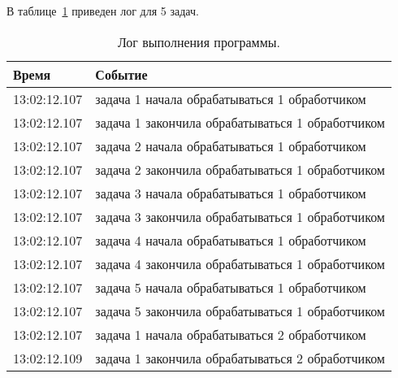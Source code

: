 В таблице~\ref{tbl:log1} приведен лог для 5 задач.

\begin{table}[h]
	\begin{center}
		\begin{threeparttable}
		\captionsetup{justification=raggedright,singlelinecheck=off}
		\caption{Лог выполнения программы.}
		\label{tbl:log1}
                    \begin{tabular}{|l|l|}
                        \hline
                        Время & Событие\\
                        \hline
                         13:02:12.107  & задача 1 начала обрабатываться 1 обработчиком \\
                        \hline
                         13:02:12.107  & задача 1 закончила обрабатываться 1 обработчиком \\
                        \hline
                         13:02:12.107  & задача 2 начала обрабатываться 1 обработчиком \\
                        \hline
                         13:02:12.107  & задача 2 закончила обрабатываться 1 обработчиком \\
                        \hline
                         13:02:12.107  & задача 3 начала обрабатываться 1 обработчиком \\
                        \hline
                         13:02:12.107  & задача 3 закончила обрабатываться 1 обработчиком \\
                        \hline
                         13:02:12.107  & задача 4 начала обрабатываться 1 обработчиком \\
                         \hline
                         13:02:12.107  & задача 4 закончила обрабатываться 1 обработчиком \\
                        \hline
                         13:02:12.107  & задача 5 начала обрабатываться 1 обработчиком \\
                        \hline
                         13:02:12.107  & задача 5 закончила обрабатываться 1 обработчиком \\
                        \hline
                         13:02:12.107  & задача 1 начала обрабатываться 2 обработчиком \\
                                                 \hline

                         13:02:12.109  & задача 1 закончила обрабатываться 2 обработчиком \\
                                                 \hline


\end{tabular}
\end{threeparttable}
\end{center}
\end{table}
